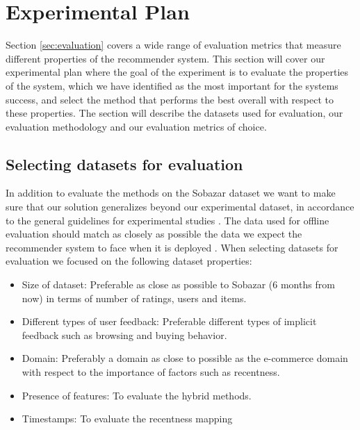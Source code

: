 
\section{Experimental Plan}


Section \ref{sec:evaluation} covers a wide range of evaluation metrics that measure different properties of the recommender system. This section will cover our experimental plan where the goal of the experiment is to evaluate the properties of the system, which we have identified as the most important for the systems success, and select the method that performs the best overall with respect to these properties. The section will describe the datasets used for evaluation, our evaluation methodology and our evaluation metrics of choice.

\subsection{Selecting datasets for evaluation}

In addition to evaluate the methods on the Sobazar dataset we want to make sure that our solution generalizes beyond our experimental dataset, in accordance to the general guidelines for experimental studies \cite{Shani2011}. The data used for offline evaluation should match as closely as possible the data we expect the recommender system to face when it is deployed \cite{Gunawardana2009}. When selecting datasets for evaluation we focused on the following dataset properties:

\begin{itemize}
\item Size of dataset: Preferable as close as possible to Sobazar (6 months from now) in terms of number of ratings, users and items.
\item Different types of user feedback: Preferable different types of implicit feedback such as browsing and buying behavior.
\item Domain: Preferably a domain as close to possible as the e-commerce domain with respect to the importance of factors such as recentness.
\item Presence of features: To evaluate the hybrid methods.
\item Timestamps: To evaluate the recentness mapping
\end{itemize}

